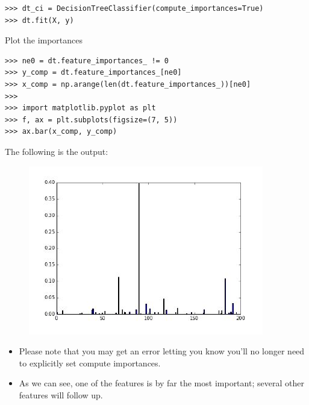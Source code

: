 \documentclass[SKL-MASTER.tex]{subfiles}
\begin{document}
\begin{framed}
\begin{verbatim}
>>> dt_ci = DecisionTreeClassifier(compute_importances=True)
>>> dt.fit(X, y)
\end{verbatim}
\end{framed}
Plot the importances

\begin{framed}
\begin{verbatim}
>>> ne0 = dt.feature_importances_ != 0
>>> y_comp = dt.feature_importances_[ne0]
>>> x_comp = np.arange(len(dt.feature_importances_))[ne0]
>>>
>>> import matplotlib.pyplot as plt
>>> f, ax = plt.subplots(figsize=(7, 5))
>>> ax.bar(x_comp, y_comp)
\end{verbatim}
\end{framed}
The following is the output:

\begin{figure}
\centering
\includegraphics[width=0.7\linewidth]{images/SKL33-DT4}
\caption{}
\label{fig:SKL33-DT4}
\end{figure}

\begin{itemize}
\item Please note that you may get an error letting you know you'll
no longer need to explicitly set compute importances.
\item As we can see, one of the features is by far the most important; several other features will
follow up.
\end{itemize}
\newpage
\end{document}
